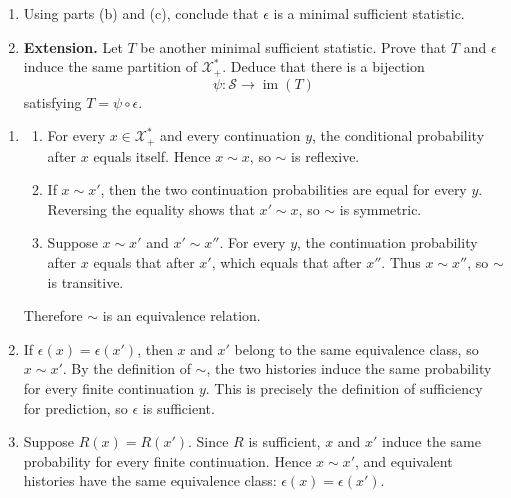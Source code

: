 \begin{exercise}
\begin{enumerate}
    \item Using parts (b) and (c), conclude that $\epsilon$ is a minimal
      sufficient statistic.

    \item \textbf{Extension.} Let $T$ be another minimal sufficient
      statistic. Prove that $T$ and $\epsilon$ induce the same partition of
      $\mathcal X_+^*$. Deduce that there is a bijection
      \[
        \psi:\mathcal S\to\operatorname{im}(T)
      \]
      satisfying $T=\psi\circ\epsilon$.
  \end{enumerate}
\end{exercise}
\begin{solution}[ex:p2-2]
    \begin{enumerate}
      \item
        \begin{enumerate}
          \item For every $x\in\mathcal X_+^*$ and every continuation $y$,
            the conditional probability after $x$ equals itself. Hence
            $x\sim x$, so $\sim$ is reflexive.

          \item If $x\sim x'$, then the two continuation probabilities are
            equal for every $y$. Reversing the equality shows that
            $x'\sim x$, so $\sim$ is symmetric.

          \item Suppose $x\sim x'$ and $x'\sim x''$. For every $y$, the
            continuation probability after $x$ equals that after $x'$, which
            equals that after $x''$. Thus $x\sim x''$, so $\sim$ is
            transitive.
        \end{enumerate}
        Therefore $\sim$ is an equivalence relation.

      \item If $\epsilon(x)=\epsilon(x')$, then $x$ and $x'$ belong to the
        same equivalence class, so $x\sim x'$. By the definition of $\sim$,
        the two histories induce the same probability for every finite
        continuation $y$. This is precisely the definition of sufficiency for
        prediction, so $\epsilon$ is sufficient.

      \item Suppose $R(x)=R(x')$. Since $R$ is sufficient, $x$ and $x'$
        induce the same probability for every finite continuation. Hence
        $x\sim x'$, and equivalent histories have the same equivalence class:
        $\epsilon(x)=\epsilon(x')$.


\end{enumerate}
\end{solution}
